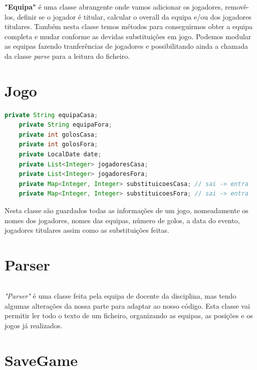 \documentclass[a4paper]{report}
\begin{document}
    \textbf{"Equipa"} é uma classe abrangente onde vamos adicionar os jogadores, removê-los, definir se o jogador é titular, calcular o overall da equipa e/ou dos jogadores titulares. Também nesta classe temos métodos para conseguirmos obter a equipa completa e mudar conforme as devidas substituições em jogo. Podemos modular as equipas fazendo tranferências de jogadores e possibilitando ainda a chamada da classe \emph{parse} para a leitura do ficheiro.
	
	
    	\newpage
    	
    	
	\section{Jogo}
	\begin{lstlisting}[language=Java]
    private String equipaCasa;
    private String equipaFora;
    private int golosCasa;
    private int golosFora;
    private LocalDate date;
    private List<Integer> jogadoresCasa;
    private List<Integer> jogadoresFora;
    private Map<Integer, Integer> substituicoesCasa; // sai -> entra
    private Map<Integer, Integer> substituicoesFora; // sai -> entra
	\end{lstlisting}
	
	Nesta classe são guardados todas as informações de um jogo, nomeadamente os nomes dos jogadores, nomes das equipas, número de golos, a data do evento, jogadores titulares assim como as substituições feitas.
	
    
    
	\section{Parser}
	\begin{lstlisting}[language=Java]
	\end{lstlisting}
	\emph{"Parser"} é uma classe feita pela equipa de docente da disciplina, mas tendo algumas alterações da nossa parte para adaptar ao nosso código. Esta classe vai permitir ler todo o texto de um ficheiro, organizando as equipas, as posições e os jogos já realizados.
	

	
	\section{SaveGame}
	\begin{lstlisting}[language=Java]
	\end{lstlisting}
	
\end{document}
